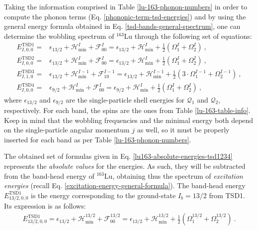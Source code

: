 Taking the information comprised in Table \ref{lu-163-phonon-numbers} in order to compute the phonon terms (Eq. \ref{phononic-term-tsd-energies}) and by using the general energy formula obtained in Eq. \ref{tsd-bands-general-spectrum}, one can determine the wobbling spectrum of $^{163}$Lu through the following set of equations:
\begin{align}
    E_{I,0,0}^\text{TSD1}=&\epsilon_{13/2}+\mathcal{H}_\text{min}^I+\mathcal{F}_{00}^I=\epsilon_{13/2}+\mathcal{H}_\text{min}^I+\frac{1}{2}\left(\Omega_1^I+\Omega_2^I\right)\ ,\nonumber\\
    E_{I,0,0}^\text{TSD2}=&\epsilon_{13/2}+\mathcal{H}_\text{min}^I+\mathcal{F}_{00}^I=\epsilon_{13/2}+\mathcal{H}_\text{min}^I+\frac{1}{2}\left(\Omega_1^I+\Omega_2^I\right)\ ,\nonumber\\
    E_{I,1,0}^\text{TSD3}=&\epsilon_{13/2}+\mathcal{H}_\text{min}^{I-1}+\mathcal{F}_{10}^{I-1}=\epsilon_{13/2}+\mathcal{H}_\text{min}^{I-1}+\frac{1}{2}\left(3\cdot\Omega_1^{I-1}+\Omega_2^{I-1}\right)\ ,\nonumber\\
    E_{I,0,0}^\text{TSD4}=&\epsilon_{9/2}+\mathcal{H}_\text{min}^{I}+\mathcal{F}_{00}^{I}=\epsilon_{9/2}+\mathcal{H}_\text{min}^{I}+\frac{1}{2}\left(\Omega_1^{I}+\Omega_2^{I}\right)\ ,
    \label{lu163-absolute-energies-tsd1234}
\end{align}
where $\epsilon_{13/2}$ and $\epsilon_{9/2}$ are the single-particle shell energies for $\mathcal{Q}_1$ and $\mathcal{Q}_2$, respectively. For each band, the spins are the ones from Table \ref{lu-163-table-info}. Keep in mind that the wobbling frequencies and the minimal energy both depend on the single-particle angular momentum $j$ as well, so it must be properly inserted for each band as per Table \ref{lu-163-phonon-numbers}. 

The obtained set of formulas given in Eq. \ref{lu163-absolute-energies-tsd1234} represents the \emph{absolute values} for the energies. As such, they will be subtracted from the band-head energy of $^{163}$Lu, obtaining thus the spectrum of \emph{excitation energies} (recall Eq. \ref{excitation-energy-general-formula}). The band-head energy $E_{13/2,0,0}^\text{TSD1}$ is the energy corresponding to the ground-state $I_b=13/2$ from TSD1. Its expression is as follows:
\begin{align}
    E_{13/2,0,0}^\text{TSD1}=\epsilon_{13/2}+\mathcal{H}_\text{min}^{13/2}+\mathcal{F}_{00}^{13/2}=\epsilon_{13/2}+\mathcal{H}_\text{min}^{13/2}+\frac{1}{2}\left(\Omega_1^{13/2}+\Omega_2^{13/2}\right)\ .
    \label{lu163-absolute-energy-band-head}
\end{align}


